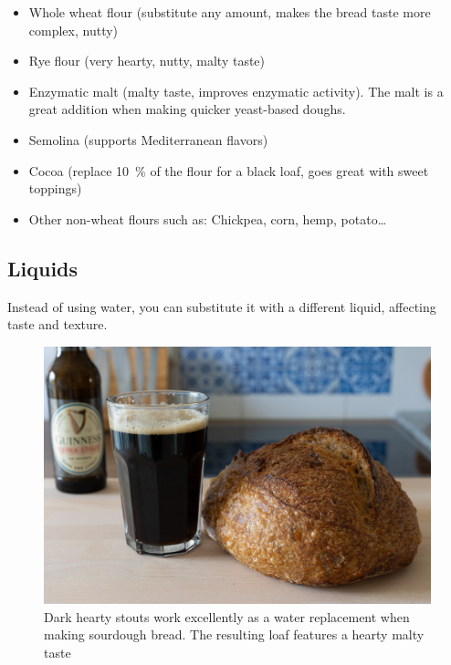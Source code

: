 \begin{itemize}
  \item Whole wheat flour (substitute any amount, makes the bread taste more
      complex, nutty)
  \item Rye flour (very hearty, nutty, malty taste)
  \item Enzymatic malt (malty taste, improves enzymatic activity). The malt is
    a great addition when making quicker yeast-based doughs.
  \item Semolina (supports Mediterranean flavors)
  \item Cocoa (replace \qty{10}{\percent} of the flour for a black loaf, goes
      great with sweet toppings)
  \item Other non-wheat flours such as: Chickpea, corn, hemp, potato\dots{}
\end{itemize}

\subsection{Liquids}

Instead of using water, you can substitute it with a different liquid,
affecting taste and texture.

\begin{figure}[htb!]
  \centering
  \includegraphics[width=\textwidth]{beer-bread}
  \caption[Stout beer bread]{Dark hearty stouts work excellently as a water
  replacement when making sourdough bread. The resulting loaf features a
  hearty malty taste}%
\end{figure}

